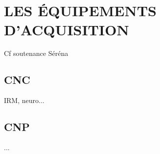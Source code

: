 \chapter{LES ÉQUIPEMENTS D'ACQUISITION}
Cf soutenance Séréna\par

\section{CNC}
IRM, neuro...
\section{CNP}
...